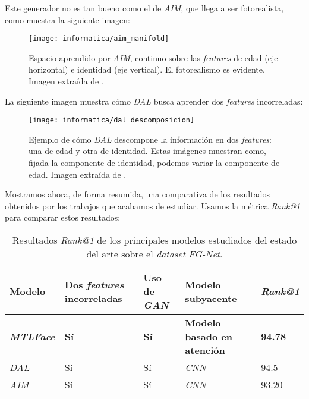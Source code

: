 Este generador no es tan bueno como el de \textit{AIM}, que llega a ser fotorealista, como muestra la siguiente imagen:

\begin{figure}[H]
	\centering
	\texttt{[image: informatica/aim\_manifold]}
	\caption{Espacio aprendido por \textit{AIM}, continuo sobre las \textit{features} de edad (eje horizontal) e identidad (eje vertical). El fotorealismo es evidente. Imagen extraída de \cite{informatica:aim}.}
\end{figure}

La siguiente imagen muestra cómo \textit{DAL} busca aprender dos \textit{features} incorreladas:

\begin{figure}[H]
	\centering
	\texttt{[image: informatica/dal\_descomposicion]}
	\caption{Ejemplo de cómo \textit{DAL} descompone la información en dos \textit{features}: una de edad y otra de identidad. Estas imágenes muestran como, fijada la componente de identidad, podemos variar la componente de edad. Imagen extraída de \cite{informatica:dal}.}
\end{figure}

Mostramos ahora, de forma resumida, una comparativa de los resultados obtenidos por los trabajos que acabamos de estudiar. Usamos la métrica \textit{Rank@1} \footnotemark para comparar estos resultados:

\begin{table}[H]
	\centering
	\begin{tabular}{|l|l|l|l|l|}
		\hline
		Modelo                    & Dos \textit{features} incorreladas & Uso de \textit{GAN} & Modelo subyacente                  & \textit{Rank@1} \\
		\hline

		\textbf{\textit{MTLFace}} & \textbf{Sí}                        & \textbf{Sí}         & \textbf{Modelo basado en atención} & \textbf{94.78}  \\
		\textit{DAL}              & Sí                                 & Sí                  & \textit{CNN}                       & 94.5            \\
		\textit{AIM}              & Sí                                 & Sí                  & \textit{CNN}                       & 93.20           \\
		\hline
	\end{tabular}
	\caption{Resultados \textit{Rank@1} de los principales modelos estudiados del estado del arte sobre el \textit{dataset} \textit{FG-Net}.}
\end{table}

